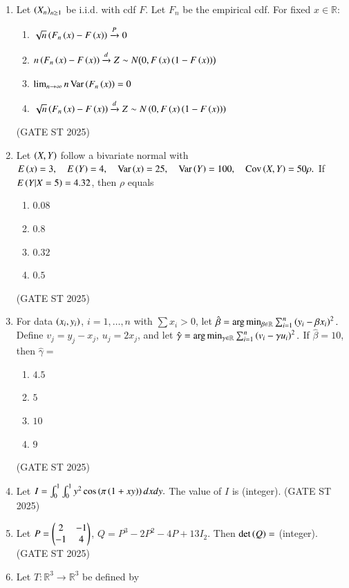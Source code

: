 \documentclass[journal,12pt,onecolumn]{IEEEtran}
\theoremstyle{remark}
\begin{document}
\begin{enumerate}
\item Let $\left(X_n\right)_{n\geq 1}$ be i.i.d. with cdf $F$. Let $F_n$ be the empirical cdf. For fixed $x\in \mathbb{R}$:
\begin{enumerate}
\item $\sqrt{n}\left(F_n\left(x\right)-F\left(x\right)\right) \xrightarrow{P} 0$
\item $n\left(F_n\left(x\right)-F\left(x\right)\right) \xrightarrow{d} Z \sim N\big(0, F\left(x\right)(1-F\left(x\right))\big)$
\item $\lim_{n\to\infty} n\operatorname{Var}\left(F_n\left(x\right)\right) = 0$
\item $\sqrt{n}\left(F_n\left(x\right)-F\left(x\right)\right) \xrightarrow{d} Z \sim N\left(0, F\left(x\right)\left(1-F\left(x\right)\right)\right)$
\end{enumerate}
\hfill{(GATE ST 2025)}
\item Let $\left(X,Y\right)$ follow a bivariate normal with
$
E\left(x\right)=3,\quad E\left(Y\right)=4,\quad \mathrm{Var}\left(x\right)=25,\quad \mathrm{Var}\left(Y\right)=100,\quad \mathrm{Cov}\left(X,Y\right)=50\rho.
$
If $E\left(Y|X=5\right)=4.32$, then $\rho$ equals
\begin{enumerate}
\item $0.08$
\item $0.8$
\item $0.32$
\item $0.5$
\end{enumerate}
\hfill{(GATE ST 2025)}
\item For data $\left(x_i,y_i\right)$, $i=1,\dots,n$ with $\sum x_i>0$, let
$
\hat{\beta} = \arg\min_{\beta\in \mathbb{R}} \sum_{i=1}^n \left(y_i - \beta x_i\right)^2.
$
Define $v_j = y_j-x_j$, $u_j = 2x_j$, and let 
$
\hat{\gamma} = \arg\min_{\gamma\in \mathbb{R}} \sum_{i=1}^n \left(v_i - \gamma u_i\right)^2.
$
If $\hat{\beta}=10$, then $\hat{\gamma}=$
\begin{enumerate}
\item $4.5$ \item $5$ \item $10$ \item $9$
\end{enumerate}
\hfill{(GATE ST 2025)}
\item Let
$
I=\int_0^1 \int_0^1 y^2 \cos\left(\pi\left(1+xy\right)\right)   dx  dy .
$
The value of $I$ is \underline{\phantom{imagine}} (integer).
\hfill{(GATE ST 2025)}
\item Let 
$P=\begin{pmatrix} 2 & -1 \\ -1 & 4 \end{pmatrix}$, 
$Q=P^3 - 2P^2 -4P + 13I_2$.  
Then $\det\left(Q\right)=$ \underline{\phantom{imagine}} (integer).
\hfill{(GATE ST 2025)}
\item Let $T:\mathbb{R}^3\to\mathbb{R}^3$ be defined by

\end{enumerate}
\end{document}
